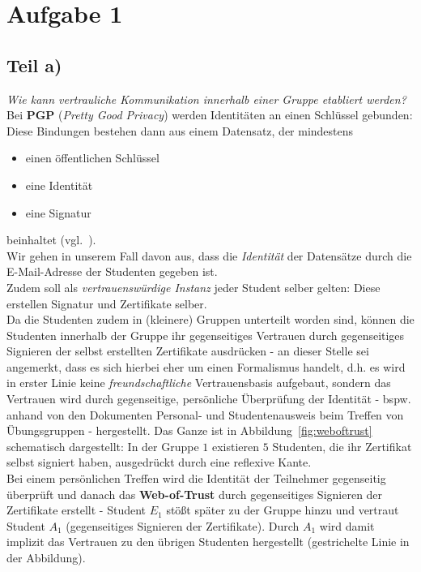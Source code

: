 \chapter{Aufgabe 1}

\section{Teil a)}

\textit{Wie kann vertrauliche Kommunikation innerhalb einer Gruppe etabliert werden?}\\

\noindent
Bei \textbf{PGP} (\textit{Pretty Good Privacy}) werden Identitäten an einen Schlüssel gebunden: Diese Bindungen bestehen dann aus einem Datensatz, der mindestens

\begin{itemize}
    \itemsep0.5em
    \item einen öffentlichen Schlüssel
    \item eine Identität
    \item eine Signatur
\end{itemize}

\noindent
beinhaltet (vgl.~\cite[43]{ITS6}).\\

\noindent
Wir gehen in unserem Fall davon aus, dass die \textit{Identität} der Datensätze durch die E-Mail-Adresse der Studenten gegeben ist.\\

\noindent
Zudem soll als \textit{vertrauenswürdige Instanz} jeder Student selber gelten: Diese erstellen Signatur und Zertifikate selber.\\
Da die Studenten zudem in (kleinere) Gruppen unterteilt worden sind, können die Studenten innerhalb der Gruppe ihr gegenseitiges Vertrauen durch gegenseitiges Signieren der selbst erstellten Zertifikate ausdrücken - an dieser Stelle sei angemerkt, dass es sich hierbei eher um einen Formalismus handelt, d.h. es wird in erster Linie keine \textit{freundschaftliche} Vertrauensbasis aufgebaut, sondern das Vertrauen wird durch gegenseitige, persönliche Überprüfung der Identität - bspw. anhand von den Dokumenten Personal- und Studentenausweis beim Treffen von Übungsgruppen - hergestellt.
Das Ganze ist in Abbildung~\ref{fig:weboftrust} schematisch dargestellt: In der Gruppe $1$ existieren $5$ Studenten, die ihr Zertifikat selbst signiert haben, ausgedrückt durch eine reflexive Kante.\\
Bei einem persönlichen Treffen wird die Identität der Teilnehmer gegenseitig überprüft und danach das \textbf{Web-of-Trust} durch gegenseitiges Signieren der Zertifikate erstellt - Student $E_1$ stößt später zu der Gruppe hinzu und vertraut Student $A_1$ (gegenseitiges Signieren der Zertifikate).
Durch $A_1$ wird damit implizit das Vertrauen zu den übrigen Studenten hergestellt (gestrichelte Linie in der Abbildung).\\

